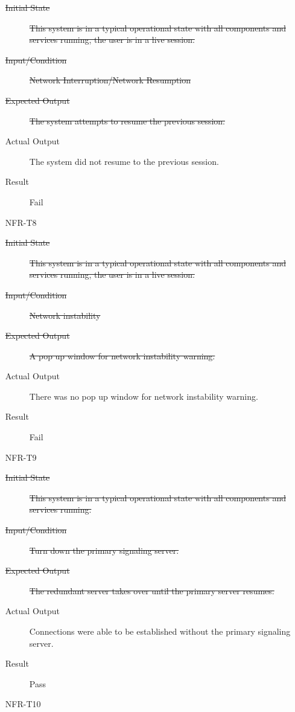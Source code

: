 \documentclass[12pt, titlepage]{article}
\begin{document}
\begin{enumerate}
\begin{description}
      \item[\sout{Initial State}] \sout{This system is in a typical operational
          state with all components and services running, the user is in a live
          session.}
      \item[\sout{Input/Condition}] \sout{Network Interruption/Network Resumption}
      \item[\sout{Expected Output}] \sout{The system attempts to resume the
          previous session.}
      \item[Actual Output] The system did not resume to the previous session.
      \item[Result] Fail
      \end{description}
    \item[NFR-T8] \label{NFRT8}
      \begin{description}
      \item[\sout{Initial State}] \sout{This system is in a typical operational
          state with all components and services running, the user is in a live
          session.}
      \item[\sout{Input/Condition}] \sout{Network instability}
      \item[\sout{Expected Output}] \sout{A pop up window for network instability
          warning.}
      \item[Actual Output] There was no pop up window for network instability
        warning.
      \item[Result] Fail
      \end{description}
    \item[NFR-T9] \label{NFRT9}
      \begin{description}
      \item[\sout{Initial State}] \sout{This system is in a typical operational
          state with all components and services running.}
      \item[\sout{Input/Condition}] \sout{Turn down the primary signaling server.}
      \item[\sout{Expected Output}] \sout{The redundant server takes over until the
          primary server resumes.}
      \item[Actual Output] Connections were able to be established without the
        primary signaling server.
      \item[Result] Pass
      \end{description}
    \item[NFR-T10] \label{NFRT10}
      \begin{description}

\end{description}
\end{enumerate}
\end{document}
